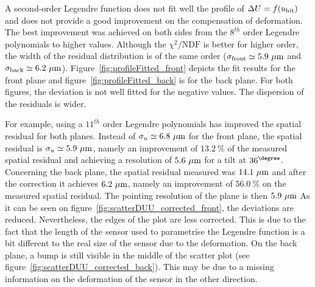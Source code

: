       A second-order Legendre function does not fit well the profile of $\Delta U=f(u_{\rm{hit}})$ and does not provide a good improvement on the compensation of deformation.
      The best improvement was achieved on both sides from the $8^{th}$ order Legendre polynomials to higher values.
      Although the $\chi^2 \text{/NDF}$ is better for higher order, the width of the residual distribution is of the same order ($\sigma_{\rm{front}}\simeq 5.9~\rm{\mu m}$ and $\sigma_{\rm{back}} \simeq 6.2~\rm{\mu m}$).
      Figure~\ref{fig:profileFitted_front} depicts the fit results for the front plane and figure~\ref{fig:profileFitted_back} is for the back plane.
      For both figures, the deviation is not well fitted for the negative values.
      The dispersion of the residuals is wider. 

      For example, using a $11^{th}$ order Legendre polynomials has improved the spatial residual for both planes. 
      Instead of $\sigma_{u} \simeq 6.8~\rm{\mu m}$ for the front plane, the spatial residual is $\sigma_{u} \simeq 5.9~\rm{\mu m}$, namely an improvement of $13.2~\%$ of the measured spatial residual and achieving a resolution of $5.6~\rm{\mu m}$ for a tilt at $36^{\degree}$.
      Concerning the back plane, the spatial residual measured was $14.1~\rm{\mu m}$ and after the correction it achieves $6.2~\rm{\mu m}$, namely an improvement of $56.0~\%$ on the measured spatial residual.
      The pointing resolution of the plane is then $5.9~\rm{\mu m}$
      As it can be seen on figure~\ref{fig:scatterDUU_corrected_front}, the deviations are reduced. 
      Nevertheless, the edges of the plot are less corrected.
      This is due to the fact that the length of the sensor used to parametrise the Legendre function is a bit different to the real size of the sensor due to the deformation.
      On the back plane, a bump is still visible in the middle of the scatter plot (see figure~\ref{fig:scatterDUU_corrected_back}).
      This may be due to a missing information on the deformation of the sensor in the other direction.

